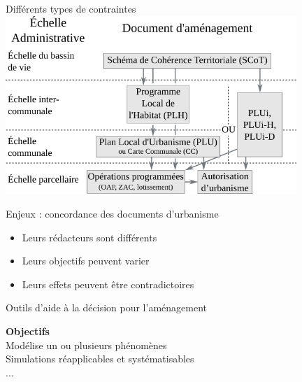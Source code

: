 \documentclass[xcolor=table]{beamer}
\begin{document}
\begin{frame}{Différents types de contraintes} 
	\includegraphics[width=11cm]{Images/planification-globale-Prez.png}	
\end{frame}



\begin{frame}{Enjeux : concordance des documents d'urbanisme}
	\begin{itemize}
		\item Leurs rédacteurs sont différents
		\item Leurs objectifs peuvent varier
		\item Leurs effets peuvent être contradictoires
	\end{itemize}
\end{frame}

\begin{frame}{Outils d'aide à la décision pour l'aménagement}
	\begin{block}{}
		\textbf{Objectifs}\\
		Modélise un ou plusieurs phénomènes\\
		Simulations réapplicables et systématisables\\
		...
	\end{block}
\end{frame}
\end{document}

